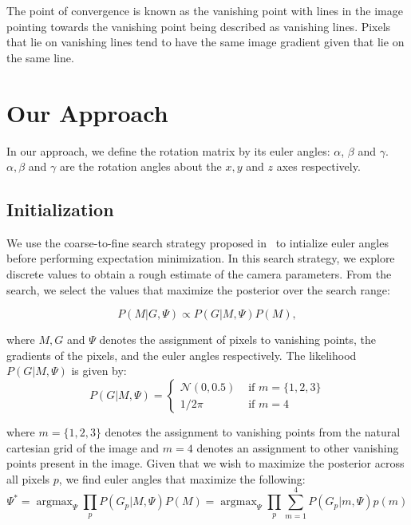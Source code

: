 \documentclass[a4paper]{article}
\begin{document}
	The point of convergence is known as the vanishing point with lines in the image pointing towards the vanishing point being described as vanishing lines. Pixels that lie on vanishing lines tend to have the same image gradient given that lie on the same line. 
	
	\section{Our Approach}
	
	In our approach, we define the rotation matrix by its euler angles: $\alpha$, $\beta$ and $\gamma$. $\alpha, \beta$ and $\gamma$ are the rotation angles about the $x, y$ and $z$ axes respectively. 
	
	
	
	\subsection{Initialization}
	
	We use the coarse-to-fine search strategy proposed in~\cite{Coughlan:2000:MWA:3008751.3008869} to intialize euler angles before performing expectation minimization. In this search strategy, we explore discrete values to obtain a rough estimate of the camera parameters. From the search, we select the values that maximize the posterior over the search range:
	
	\begin{equation}
		P\left(M | G, \Psi\right) \propto P\left(G | M, \Psi\right) P(M),
	\end{equation}
	
	where $M, G$ and $\Psi$ denotes the assignment of pixels to vanishing points, the gradients of the pixels, and the euler angles respectively. The likelihood $P\left(G | M, \Psi \right)$ is given by: 
	\begin{equation}
	P\left(G | M, \Psi \right)=\left\{\begin{array}{ll}\mathcal{N}(0, 0.5) & {\text { if } m = \{1, 2, 3\}} \\ {1 / 2\pi} & {\text { if } m=4}\end{array}\right.
	\end{equation}
	
	where $m=\{1,2,3\}$ denotes the assignment to vanishing points from the natural cartesian grid of the image and $m={4}$ denotes an assignment to other vanishing points present in the image. Given that we wish to maximize the posterior across all pixels $p$, we find euler angles that maximize the following:
	\begin{equation}
		\Psi^*=\operatorname{argmax}_\Psi \prod_p P(G_p|M,\Psi)P(M) = \operatorname{argmax}_{\Psi} \prod_{p} \sum_{m=1}^4 P\left(G_p|m, \Psi\right)p(m)
	\end{equation}
	
\end{document}
